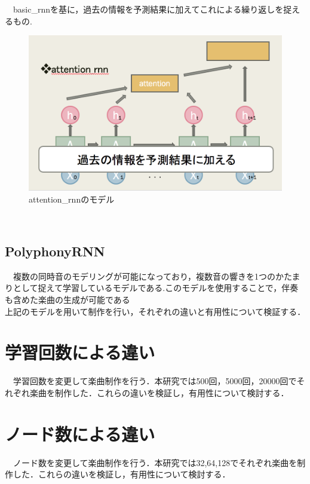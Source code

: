 　basic\_rnnを基に，過去の情報を予測結果に加えてこれによる繰り返しを捉えるもの.
\begin{figure}[!ht]
    \begin{screen}
    \begin{center}
        \includegraphics[scale=0.8,clip]{./img/attention1.png}
        \caption{attention\_rnnのモデル}
        \label{fig:attentio_rnnのモデル}
    \end{center}
    \end{screen}
\end{figure}\\
\subsection{PolyphonyRNN}
　複数の同時音のモデリングが可能になっており，複数音の響きを1つのかたまりとして捉えて学習しているモデルである.このモデルを使用することで，伴奏も含めた楽曲の生成が可能である\\
上記のモデルを用いて制作を行い，それぞれの違いと有用性について検証する．
\newpage
\section{学習回数による違い}
　学習回数を変更して楽曲制作を行う．本研究では500回，5000回，20000回でそれぞれ楽曲を制作した．これらの違いを検証し，有用性について検討する．
\section{ノード数による違い}
　ノード数を変更して楽曲制作を行う．本研究では32,64,128でそれぞれ楽曲を制作した．これらの違いを検証し，有用性について検討する．